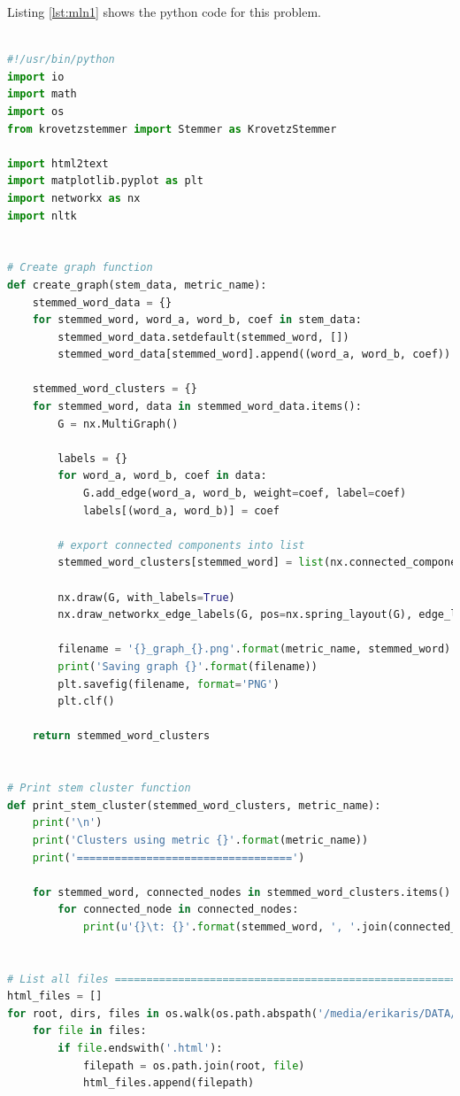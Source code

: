 \documentclass[letterpaper,11pt]{article}
\begin{document}
Listing \ref{lst:mln1} shows the python code for this problem. 
\begin{lstlisting}[language=python, caption={Python code for MLN1}, label={lst:mln1}]

#!/usr/bin/python
import io
import math
import os
from krovetzstemmer import Stemmer as KrovetzStemmer

import html2text
import matplotlib.pyplot as plt
import networkx as nx
import nltk


# Create graph function
def create_graph(stem_data, metric_name):
    stemmed_word_data = {}
    for stemmed_word, word_a, word_b, coef in stem_data:
        stemmed_word_data.setdefault(stemmed_word, [])
        stemmed_word_data[stemmed_word].append((word_a, word_b, coef))

    stemmed_word_clusters = {}
    for stemmed_word, data in stemmed_word_data.items():
        G = nx.MultiGraph()

        labels = {}
        for word_a, word_b, coef in data:
            G.add_edge(word_a, word_b, weight=coef, label=coef)
            labels[(word_a, word_b)] = coef

        # export connected components into list
        stemmed_word_clusters[stemmed_word] = list(nx.connected_components(G))

        nx.draw(G, with_labels=True)
        nx.draw_networkx_edge_labels(G, pos=nx.spring_layout(G), edge_labels=labels)

        filename = '{}_graph_{}.png'.format(metric_name, stemmed_word)
        print('Saving graph {}'.format(filename))
        plt.savefig(filename, format='PNG')
        plt.clf()

    return stemmed_word_clusters


# Print stem cluster function
def print_stem_cluster(stemmed_word_clusters, metric_name):
    print('\n')
    print('Clusters using metric {}'.format(metric_name))
    print('==================================')

    for stemmed_word, connected_nodes in stemmed_word_clusters.items():
        for connected_node in connected_nodes:
            print(u'{}\t: {}'.format(stemmed_word, ', '.join(connected_node)))


# List all files ===========================================================================================
html_files = []
for root, dirs, files in os.walk(os.path.abspath('/media/erikaris/DATA/ODU/Semester 3/intro_to_info_retrieval/assignments/a2/code_report/articles/z')):
    for file in files:
        if file.endswith('.html'):
            filepath = os.path.join(root, file)
            html_files.append(filepath)



\end{lstlisting}
\end{document}
